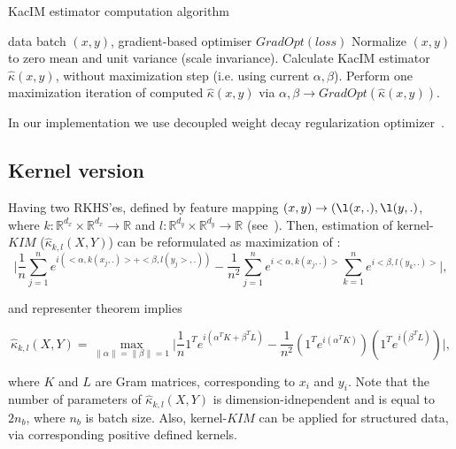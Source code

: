\documentclass{article}
\begin{document}
\begin{algorithm}
\caption{KacIM estimator computation algorithm}\label{alg:estimator_computation}
\begin{algorithmic}
\Require data batch $(x,y)$, gradient-based optimiser $GradOpt(loss)$
\State Normalize $(x,y)$ to zero mean and unit variance (scale invariance).
\State Calculate KacIM estimator $\hat{\kappa}(x,y)$, without maximization step (i.e. using current $\alpha, \beta$).
\State Perform one maximization iteration of computed $\hat{\kappa}(x,y)$ via $\alpha, \beta \rightarrow GradOpt(\hat{\kappa}(x,y))$.
\end{algorithmic}
\end{algorithm}
In our implementation we use decoupled weight decay regularization optimizer~\cite{Loshchilov2019DecoupledWD}.

\subsection{Kernel version}

Having two RKHS'es, defined by feature mapping $(x,y) \rightarrow (\l(x,.), \l(y,.)$, where $k: \mathbb{R}^{d_{x}} \times \mathbb{R}^{d_{x}} \rightarrow \mathbb{R}$ and $l: \mathbb{R}^{d_{y}} \times \mathbb{R}^{d_{y}} \rightarrow \mathbb{R}$ (see~\cite{10.5555/3279302}). Then, estimation of kernel-$KIM$ ($\hat{\kappa}_{k,l} (X,Y)$) can be reformulated as maximization of :
\begin{equation}
\label{eq:kernel_estimator}
    \vert \frac{1}{n} \sum_{j=1}^{n} e^{i(<\alpha, k(x_{j},.)> + <\beta, l(y_{j}>,.)) } - \frac{1}{n^2} \sum_{j=1}^{n} e^{i <\alpha, k(x_{j},.)>}\sum_{k=1}^{n} e^{i<\beta, l(y_{k},.)>}\vert,
\end{equation}

and representer theorem\cite{?} implies 

\begin{equation}
\label{eq:kernel_estimator1}
    \hat{\kappa}_{k,l} (X,Y) = \max_{\|\alpha\| = \|\beta\| = 1} \vert \frac{1}{n} 1^{T} e^{i(\alpha^{T} K + \beta^{T} L)} - \frac{1}{n^2} (1^{T} e^{i(\alpha^{T}K)}) (1^{T} e^{i(\beta^{T}L)}) \vert,
\end{equation}

where $K$ and $L$ are Gram matrices, corresponding to $x_{i}$ and $y_{i}$. Note that the number of parameters of $\hat{\kappa}_{k,l} (X,Y)$ is dimension-idnependent and is equal to $2n_{b}$, where $n_{b}$ is batch size. Also, kernel-$KIM$ can be applied for structured data, via corresponding positive defined kernels.
\end{document}
